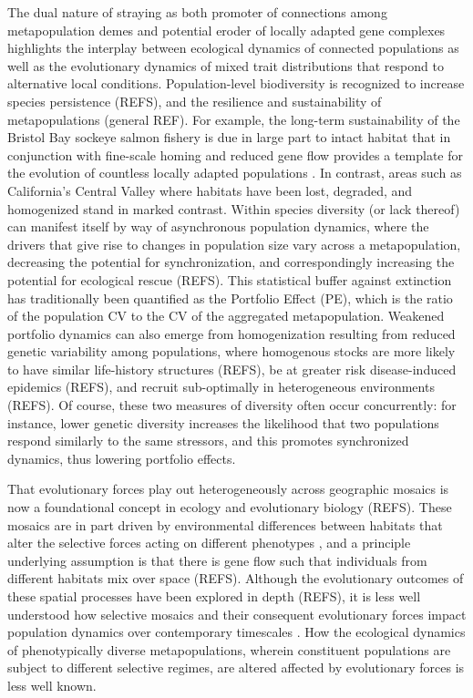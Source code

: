 \documentclass[twocolumn,preprintnumbers,amsmath,amssymb,superscriptaddress]{revtex4}
\begin{document}
The dual nature of straying as both promoter of connections among metapopulation demes and potential eroder of locally adapted gene complexes highlights the interplay between ecological dynamics of connected populations as well as the evolutionary dynamics of mixed trait distributions that respond to alternative local conditions.
Population-level biodiversity is recognized to increase species persistence (REFS), and the resilience and sustainability of metapopulations (general REF).
For example, the long-term sustainability of the Bristol Bay sockeye salmon fishery is due in large part to intact habitat that in conjunction with fine-scale homing and reduced gene flow provides a template for the evolution of countless locally adapted populations \cite{Hilborn:2003gf,Schindler:2010he,Anonymous:2014ku,Satterthwaite:2015ge}.
In contrast, areas such as California's Central Valley where habitats have been lost, degraded, and homogenized stand in marked contrast.
Within species diversity (or lack thereof) can manifest itself by way of asynchronous population dynamics, where the drivers that give rise to changes in population size vary across a metapopulation, decreasing the potential for synchronization, and correspondingly increasing the potential for ecological rescue (REFS).
This statistical buffer against extinction has traditionally been quantified as the Portfolio Effect (PE), which is the ratio of the population CV to the CV of the aggregated metapopulation.
Weakened portfolio dynamics can also emerge from homogenization resulting from  reduced genetic variability among populations, where homogenous stocks are more likely to have similar life-history structures (REFS), be at greater risk disease-induced epidemics (REFS), and recruit sub-optimally in heterogeneous environments (REFS).
Of course, these two measures of diversity often occur concurrently: for instance, lower genetic diversity increases the likelihood that two populations respond similarly to the same stressors, and this promotes synchronized dynamics, thus lowering portfolio effects.

That evolutionary forces play out heterogeneously across geographic mosaics is now a foundational concept in ecology and evolutionary biology (REFS).
These mosaics are in part driven by environmental differences between habitats that alter the selective forces acting on different phenotypes \cite{Endler:1986tz}, and a principle underlying assumption is that there is gene flow such that individuals from different habitats mix over space (REFS).
Although the evolutionary outcomes of these spatial processes have been explored in depth (REFS), it is less well understood how selective mosaics and their consequent evolutionary forces impact population dynamics over contemporary timescales \cite{Hendry:2016un}.
How the ecological dynamics of phenotypically diverse metapopulations, wherein constituent populations are subject to different selective regimes, are altered affected by evolutionary forces is less well known. %
\end{document}
